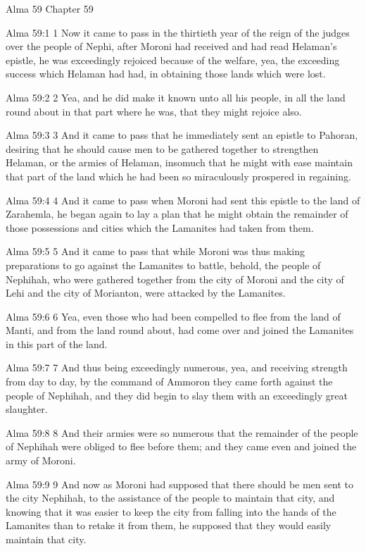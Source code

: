 Alma 59
Chapter 59

Alma 59:1
 1 Now it came to pass in the thirtieth year of the reign of the
judges over the people of Nephi, after Moroni had received and
had read Helaman's epistle, he was exceedingly rejoiced because
of the welfare, yea, the exceeding success which Helaman had had,
in obtaining those lands which were lost.

Alma 59:2
 2 Yea, and he did make it known unto all his people, in all the
land round about in that part where he was, that they might
rejoice also.

Alma 59:3
 3 And it came to pass that he immediately sent an epistle to
Pahoran, desiring that he should cause men to be gathered
together to strengthen Helaman, or the armies of Helaman,
insomuch that he might with ease maintain that part of the land
which he had been so miraculously prospered in regaining.

Alma 59:4
 4 And it came to pass when Moroni had sent this epistle to the
land of Zarahemla, he began again to lay a plan that he might
obtain the remainder of those possessions and cities which the
Lamanites had taken from them.

Alma 59:5
 5 And it came to pass that while Moroni was thus making
preparations to go against the Lamanites to battle, behold, the
people of Nephihah, who were gathered together from the city of
Moroni and the city of Lehi and the city of Morianton, were
attacked by the Lamanites.

Alma 59:6
 6 Yea, even those who had been compelled to flee from the land
of Manti, and from the land round about, had come over and joined
the Lamanites in this part of the land.

Alma 59:7
 7 And thus being exceedingly numerous, yea, and receiving
strength from day to day, by the command of Ammoron they came
forth against the people of Nephihah, and they did begin to slay
them with an exceedingly great slaughter.

Alma 59:8
 8 And their armies were so numerous that the remainder of the
people of Nephihah were obliged to flee before them; and they
came even and joined the army of Moroni.

Alma 59:9
 9 And now as Moroni had supposed that there should be men sent
to the city Nephihah, to the assistance of the people to maintain
that city, and knowing that it was easier to keep the city from
falling into the hands of the Lamanites than to retake it from
them, he supposed that they would easily maintain that city.


